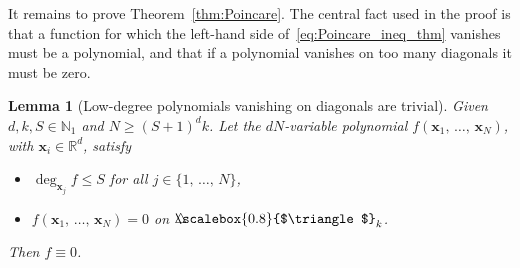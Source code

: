 \documentclass[10pt]{amsart}
\newtheorem{lemm}[theo]{Lemma}\newtheorem{prop}[theo]{Proposition}\newtheorem{coro}[theo]{Corollary}\newtheorem{conj}[theo]{Conjecture}
\theoremstyle{definition}\newtheorem{defi}[theo]{Definition}\newtheorem{rema}[theo]{Remark}\newtheorem{exam}[theo]{Example}\newtheorem{exem}[theo]{Example}\newtheorem{nota}[theo]{Notation}
\newcommand*\N {\mathbb{N}}
\newcommand*\R {\mathbb{R}}
\newcommand\1{{\ensuremath {\mathds 1} }}
\newcommand{\bx}{\mathbf{x}}
\newcommand{\bDelta}{{\mbox{$\triangle$}\hspace{-8.6pt}\scalebox{0.8}{$\triangle$}}}
\begin{document}
It remains to prove Theorem~\ref{thm:Poincare}. The central fact used in the proof is that a function for which the left-hand side of~\eqref{eq:Poincare_ineq_thm} vanishes must be a polynomial, and that if a polynomial vanishes on too many diagonals it must be zero.

\begin{lemm}[Low-degree polynomials vanishing on diagonals are trivial]\label{lem:Polynomial_vanishing}
Given $d,k,S\in \N_1$ and $N \ge (S+1)^d k$. Let the $dN$-variable polynomial $f(\bx_1,\,\ldots,\,\bx_N)$, with $\bx_i\in \R^d$, satisfy
\begin{itemize}
\item $\deg_{\bx_j} f\le S$ for all $j \in \{1,\,\ldots,\,N\}$,
\item $f(\bx_1,\,\ldots,\,\bx_N)=0$ on $\bDelta_k$.
\end{itemize}
Then $f\equiv 0$.
\end{lemm}
\end{document}
